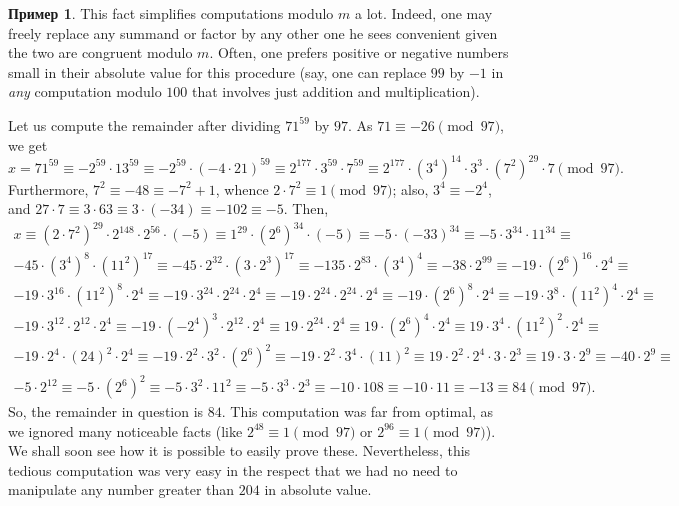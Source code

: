 \documentclass[12pt,notitlepage]{article}
\theoremstyle{plain}
\theoremstyle{definition}
\newtheorem{exm}[thm]{Пример}
\theoremstyle{plain}
\newcommand{\1}{\mathbf{1}}
\newcommand{\0}{\mathbf{0}}
\begin{document}
\begin{exm}
	This fact simplifies computations modulo $m$ a lot. Indeed, one may freely replace any summand or factor by any other one he sees convenient given the two are congruent modulo $m$. Often, one prefers positive or negative numbers small in their absolute value for this procedure (say, one can replace $99$ by $-1$ in \emph{any} computation modulo $100$ that involves just addition and multiplication).
	
	Let us compute the remainder after dividing $71^{59}$ by $97$. As $71 \equiv -26 \pmod{97}$, we get
	$$x = 71^{59} \equiv -2^{59}\cdot 13^{59} \equiv -2^{59}\cdot (-4\cdot 21)^{59} \equiv 2^{177} \cdot 3^{59} \cdot 7^{59} \equiv 2^{177} \cdot (3^4)^{14} \cdot 3^3 \cdot (7^2)^{29} \cdot 7  \pmod {97}.$$
	Furthermore, $7^2 \equiv -48 \equiv -7^2 + 1$, whence $2\cdot7^2 \equiv 1 \pmod{97}$; also, $3^4 \equiv -2^4$, and $27\cdot 7 \equiv 3 \cdot 63 \equiv 3 \cdot (-34) \equiv -102 \equiv -5$. Then,
	\begin{multline*}
		x \equiv (2\cdot 7^2)^{29} \cdot 2^{148} \cdot 2^{56} \cdot (-5) \equiv 1^{29} \cdot (2^6)^{34} \cdot (-5) \equiv -5 \cdot (-33) ^{34} \equiv -5 \cdot 3^{34} \cdot 11^{34}  \equiv \\
		-45 \cdot (3^4)^{8} \cdot (11^2)^{17} \equiv -45 \cdot 2^{32} \cdot (3 \cdot 2^3)^{17} \equiv -135 \cdot 2^{83} \cdot (3^4)^4  \equiv -38 \cdot 2^{99} \equiv -19 \cdot (2^6)^{16} \cdot 2^4 \equiv \\
		-19 \cdot 3^{16} \cdot (11^2)^8 \cdot 2^4 \equiv -19 \cdot 3^{24} \cdot 2^{24} \cdot 2^4 \equiv -19 \cdot 2^{24} \cdot 2^{24} \cdot 2^4  \equiv -19 \cdot (2^6)^8 \cdot 2^4 \equiv -19 \cdot 3^{8} \cdot (11^2)^4 \cdot 2^4 \equiv\\
		-19 \cdot 3^{12} \cdot 2^{12} \cdot 2^{4} \equiv -19 \cdot (-2^{4})^3 \cdot 2^{12} \cdot 2^4 \equiv 19 \cdot 2^{24} \cdot 2^4 \equiv 19 \cdot (2^6)^4 \cdot 2^4 \equiv 19 \cdot 3^{4} \cdot (11^2)^2 \cdot 2^4 \equiv\\
		-19 \cdot 2^{4} \cdot (24)^2 \cdot 2^4 \equiv -19 \cdot 2^2 \cdot 3^2 \cdot (2^6)^2 \equiv -19 \cdot 2^2 \cdot 3^4 \cdot (11)^2 \equiv 19 \cdot 2^2 \cdot 2^4 \cdot 3 \cdot 2^3 \equiv 19 \cdot 3 \cdot 2^9 \equiv -40 \cdot 2^9 \equiv\\
		-5 \cdot 2^{12} \equiv -5 \cdot (2^6)^2 \equiv -5 \cdot 3^2 \cdot 11^2 \equiv
		-5 \cdot 3^3 \cdot 2^3 \equiv -10 \cdot 108 \equiv -10 \cdot 11 \equiv -13 \equiv 84 \pmod {97}.
	\end{multline*}
	So, the remainder in question is $84$. This computation was far from optimal, as we ignored many noticeable facts (like $2^{48} \equiv 1 \pmod {97}$ or $2^{96} \equiv 1 \pmod {97}$). We shall soon see how it is possible to easily prove these. Nevertheless, this tedious computation was very easy in the respect that we had no need to manipulate any number greater than $204$ in absolute value.
\end{exm}
\end{document}
